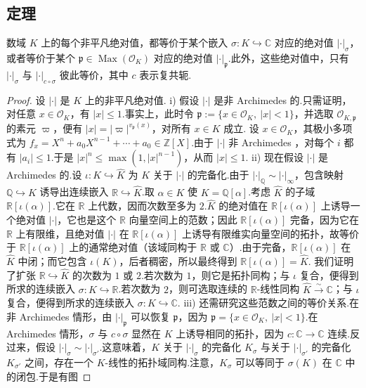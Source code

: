 \subsection{定理}\label{sec:nt-4-1-5}
\begin{theorem*}
数域 $K$ 上的每个非平凡绝对值，都等价于某个嵌入 $\sigma\colon K\hookrightarrow\mathbb C$ 对应的绝对值 $|\cdot|_\sigma$，或者等价于某个 $\mathfrak p\in\operatorname{Max}(\mathcal O_K)$ 对应的绝对值 $|\cdot|_{\mathfrak p}$.此外，这些绝对值中，只有 $|\cdot|_\sigma$ 与 $|\cdot|_{c\circ\sigma}$ 彼此等价，其中 $c$ 表示复共轭.
\end{theorem*}
\begin{proof}
设 $|\cdot|$ 是 $K$ 上的非平凡绝对值.
\textup{i)} 假设 $|\cdot|$ 是非 Archimedes 的.只需证明，对任意 $x\in\mathcal O_K$，有 $|x|\le1$.事实上，此时令 $\mathfrak p:=\{x\in\mathcal O_K,\ |x|<1\}$，并选取 $\mathcal O_{K,\mathfrak p}$ 的素元 $\varpi$，便有 $|x|=|\varpi|^{v_{\mathfrak p}(x)}$，对所有 $x\in K$ 成立.
设 $x\in\mathcal O_K$，其极小多项式为 $f_x=X^n+a_0X^{n-1}+\cdots+a_0\in\mathbb Z[X]$.由于 $|\cdot|$ 非 Archimedes ，对每个 $i$ 都有 $|a_i|\le1$.于是 $|x|^n\le\max(1,|x|^{n-1})$，从而 $|x|\le1$.
\textup{ii)} 现在假设 $|\cdot|$ 是Archimedes 的.设 $\iota\colon K\hookrightarrow\widehat K$ 为 $K$ 关于 $|\cdot|$ 的完备化.由于 $|\cdot|_{\mathbb Q}\sim|\cdot|_\infty$，包含映射 $\mathbb Q\hookrightarrow K$ 诱导出连续嵌入 $\mathbb R\hookrightarrow\widehat K$.取 $\alpha\in K$ 使 $K=\mathbb Q[\alpha]$.考虑 $\widehat K$ 的子域 $\mathbb R[\iota(\alpha)]$.它在 $\mathbb R$ 上代数，因而次数至多为 $2$.$\widehat K$ 的绝对值在 $\mathbb R[\iota(\alpha)]$ 上诱导一个绝对值 $|\cdot|$，它也是这个 $\mathbb R$ 向量空间上的范数；因此 $\mathbb R[\iota(\alpha)]$ 完备，因为它在 $\mathbb R$ 上有限维，且绝对值 $|\cdot|$ 在 $\mathbb R[\iota(\alpha)]$ 上诱导有限维实向量空间的拓扑，故等价于 $\mathbb R[\iota(\alpha)]$ 上的通常绝对值（该域同构于 $\mathbb R$ 或 $\mathbb C$）.由于完备，$\mathbb R[\iota(\alpha)]$ 在 $\widehat K$ 中闭；而它包含 $\iota(K)$，后者稠密，所以最终得到 $\mathbb R[\iota(\alpha)]=\widehat K$.
我们证明了扩张 $\mathbb R\hookrightarrow\widehat K$ 的次数为 $1$ 或 $2$.若次数为 $1$，则它是拓扑同构；与 $\iota$ 复合，便得到所求的连续嵌入 $\sigma\colon K\hookrightarrow\mathbb R$.若次数为 $2$，则可选取连续的 $\mathbb R$-线性同构 $\widehat K\xrightarrow{\sim}\mathbb C$；与 $\iota$ 复合，便得到所求的连续嵌入 $\sigma\colon K\hookrightarrow\mathbb C$.
\textup{iii)} 还需研究这些范数之间的等价关系.在非 Archimedes 情形，由 $|\cdot|_{\mathfrak p}$ 可以恢复 $\mathfrak p$，因为 $\mathfrak p=\{x\in\mathcal O_K,\ |x|<1\}$.在Archimedes 情形，$\sigma$ 与 $c\circ\sigma$ 显然在 $K$ 上诱导相同的拓扑，因为 $c\colon\mathbb C\longrightarrow\mathbb C$ 连续.反过来，假设 $|\cdot|_\sigma\sim|\cdot|_{\sigma'}$.这意味着，$K$ 关于 $|\cdot|_\sigma$ 的完备化 $K_\sigma$ 与关于 $|\cdot|_{\sigma'}$ 的完备化 $K_{\sigma'}$ 之间，存在一个 $K$-线性的拓扑域同构.注意，$K_\sigma$ 可以等同于 $\sigma(K)$ 在 $\mathbb C$ 中的闭包.于是有图

\end{proof}
